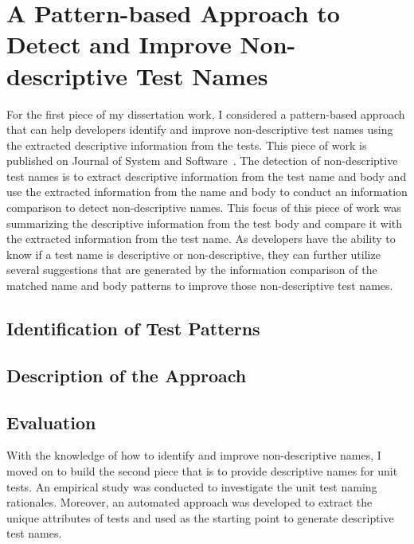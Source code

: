 \section{A Pattern-based Approach to Detect and Improve Non-descriptive Test Names}
\label{sec:test-pattern-section}

For the first piece of my dissertation work, I considered a pattern-based approach that can help developers identify and improve non-descriptive test names using the extracted descriptive information from the tests.
%
This piece of work is published on Journal of System and Software~\cite{wu2020pattern}.
%
The detection of non-descriptive test names is to extract descriptive information from the test name and body and use the extracted information  from the name and body to conduct an information comparison to detect non-descriptive names.
%
This focus of this piece of work was summarizing the descriptive information from the test body and compare it with the extracted information from the test name.
%
As developers have the ability to know if a test name is descriptive or non-descriptive, they can further utilize several suggestions that are generated by the information comparison of the matched name and body patterns to improve those non-descriptive test names.


\subsection{Identification of Test Patterns}
\label{sec:test_patterns}

\subsection{Description of the Approach}
\label{sec:approach-pattern}

\subsection{Evaluation}
\label{sec:evaluation-pattern}


With the knowledge of how to identify and improve non-descriptive names, I moved on to build the second piece that is to provide descriptive names for unit tests.
%
An empirical study was conducted to investigate the unit test naming rationales.
%
Moreover, an automated approach was developed to extract the unique attributes of tests and used as the starting point to generate descriptive test names.